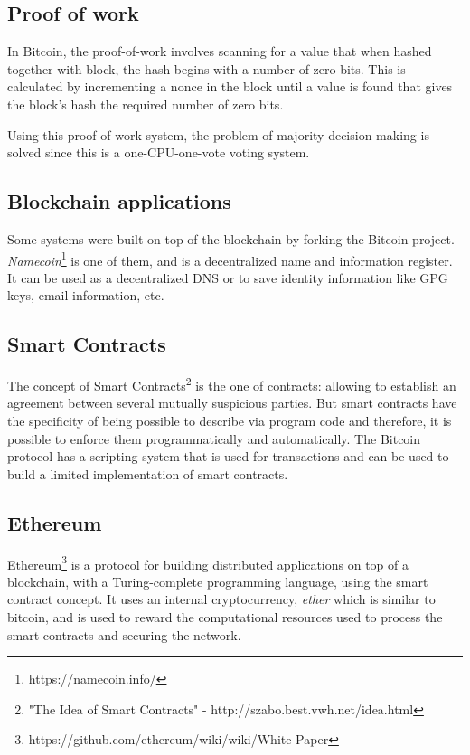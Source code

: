 \subsection{Proof of work}
In Bitcoin, the proof-of-work involves scanning for a value that when hashed together with block, the hash begins with a number of zero bits. This is calculated by incrementing a nonce in the block until a value is found that gives the block's hash the required number of zero bits.

Using this proof-of-work system, the problem of majority decision making is solved since this is a one-CPU-one-vote voting system.

\subsection{Blockchain applications}
Some systems were built on top of the blockchain by forking the Bitcoin project.
\textit{Namecoin}\footnote{https://namecoin.info/} is one of them, and is a decentralized name and information register. It can be used as a decentralized DNS or to save identity information like GPG keys, email information, etc.

\subsection{Smart Contracts} The concept of Smart Contracts\footnote{"The Idea of Smart Contracts" - http://szabo.best.vwh.net/idea.html}\cite{40673} is the one of contracts: allowing to establish an agreement between several mutually suspicious parties. But smart contracts have the specificity of being possible to describe via program code and therefore, it is possible to enforce them programmatically and automatically.
The Bitcoin protocol has a scripting system that is used for transactions and can be used to build a limited implementation of smart contracts.

\subsection{Ethereum} Ethereum\footnote{https://github.com/ethereum/wiki/wiki/White-Paper} is a protocol for building distributed applications on top of a blockchain, with a Turing-complete programming language, using the smart contract concept.
It uses an internal cryptocurrency, \textit{ether} which is similar to bitcoin, and is used to reward the computational resources used to process the smart contracts and securing the network.

